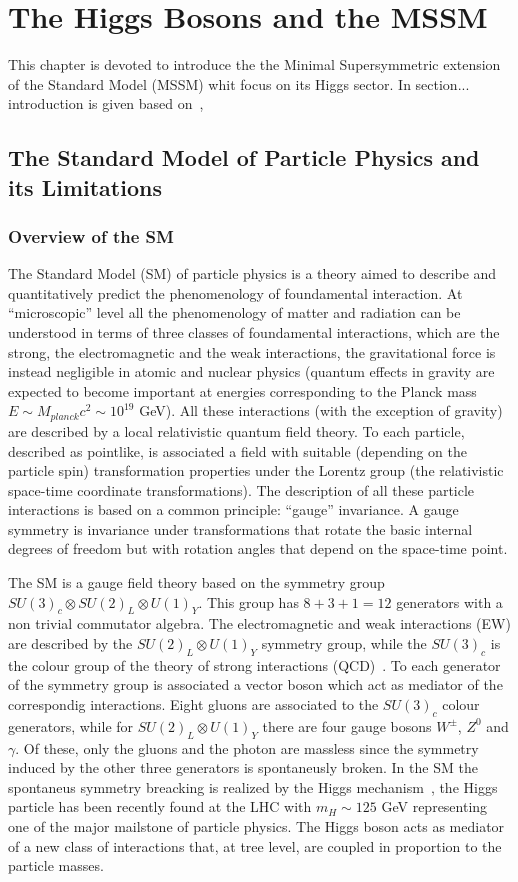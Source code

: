 \chapter{The Higgs Bosons and the MSSM}
This chapter is devoted to introduce the the Minimal Supersymmetric 
extension of the Standard Model (MSSM) whit focus on  its Higgs sector.
In section... introduction is given based on~\cite{Altarelli}, 


\clearpage

\section{The Standard Model of Particle Physics and its Limitations}
\subsection{Overview of the SM}
The Standard Model (SM) of particle physics is a theory aimed to describe and quantitatively predict
the phenomenology of foundamental interaction. At ``microscopic''  level all the phenomenology of matter and 
radiation can be understood in terms of three classes of foundamental interactions, which are the strong, the electromagnetic
and the weak interactions, the gravitational force is instead negligible in atomic and nuclear physics (quantum effects in gravity are
expected to become important at energies corresponding to the Planck mass $E \sim M_{planck} c^2 \sim 10^{19}$ GeV).
All these interactions (with the exception of gravity) are described by a local relativistic quantum field theory.
To each particle, described as pointlike, is associated a field with suitable
(depending on the particle spin) transformation properties under the Lorentz group (the
relativistic space-time coordinate transformations). The description
of all these particle interactions is based on a common principle: ``gauge'' invariance. A
gauge symmetry is invariance under transformations that rotate the basic internal degrees of freedom but
 with rotation angles that depend on the space-time point.

The SM is a gauge field theory based on the symmetry group $SU(3)_c \otimes SU(2)_L \otimes U(1)_Y$. This group has $8+3+1=12$
generators with a non trivial commutator algebra. The electromagnetic and weak interactions (EW) are described \cite{} by the 
$SU(2)_L \otimes U(1)_Y$ symmetry group, while the $ SU(3)_c$ is the colour group of the theory of strong interactions (QCD)~\cite{}.
To each generator of the symmetry group is associated a vector boson which act as mediator of the correspondig interactions.
Eight gluons are associated to the $ SU(3)_c$ colour generators, while for $SU(2)_L \otimes U(1)_Y$ there are four gauge bosons $W^{\pm}$,
$Z^0$ and $\gamma$. Of these, only the gluons and the photon are massless since the symmetry induced by the other three generators is
spontaneusly broken. In the SM the spontaneus symmetry breacking is realized by the Higgs mechanism~\cite{}, the Higgs particle has 
been recently found at the LHC with $m_H \sim 125$ GeV \cite{} representing one of the major mailstone of particle physics.
The Higgs boson acts as mediator of a new class of interactions that, at tree level, are coupled in proportion to the particle masses.

